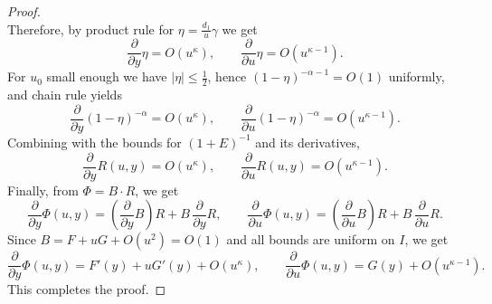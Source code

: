 \documentclass[10pt,a4paper]{amsart}
\begin{document}
\begin{proof}
\[    \]
    Therefore, by product rule for $\eta=\frac{d_1}{u}\gamma$ we get
    \[
        \frac{\partial}{\partial y} \eta=O(u^\kappa),\qquad
        \frac{\partial}{\partial u} \eta=O(u^{\kappa-1}).
    \]
    For $u_0$ small enough we have $|\eta|\le \frac12$, hence
    $(1-\eta)^{-\alpha-1}=O(1)$ uniformly, and chain rule yields
    \[
        \frac{\partial}{\partial y} (1-\eta)^{-\alpha}=O(u^\kappa),\qquad
        \frac{\partial}{\partial u} (1-\eta)^{-\alpha}=O(u^{\kappa-1}).
    \]
    Combining with the bounds for $(1+E)^{-1}$ and its derivatives,
    \[
        \frac{\partial}{\partial y} R(u,y)=O(u^\kappa),\qquad
        \frac{\partial}{\partial u} R(u,y)=O(u^{\kappa-1}).
    \]
    Finally, from $\Phi=B\cdot R$, we get 
    \[
        \frac{\partial}{\partial y} \Phi(u,y)=(\frac{\partial}{\partial y} B)R+B\,\frac{\partial}{\partial y} R,\qquad
        \frac{\partial}{\partial u} \Phi(u,y)=(\frac{\partial}{\partial u} B)R+B\,\frac{\partial}{\partial u} R.
    \]
    Since $B=F+uG+O(u^2)=O(1)$ and all bounds are uniform on $I$, we get
    \[
        \frac{\partial}{\partial y} \Phi(u,y)=F'(y)+uG'(y)+O(u^\kappa),\qquad
        \frac{\partial}{\partial u} \Phi(u,y)=G(y)+O(u^{\kappa-1}).
    \]
    This completes the proof.
\end{proof}
\end{document}

